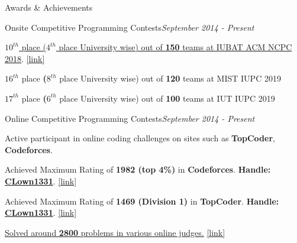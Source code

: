 \documentclass{resume}
\begin{document}
\begin{rSection}{Awards \& Achievements} 

\begin{rSubsection}{Onsite Competitive Programming Contests}{\em September 2014 - Present}{}{}{}
\item \href{https://icpc.baylor.edu/ICPCID/DII3NHEO8O8I}{\textbf{$10^{th}$} place (\textbf{$4^{th}$} place University wise) out of \textbf{150} teams at IUBAT ACM NCPC 2018}. \href{https://icpc.baylor.edu/ICPCID/DII3NHEO8O8I}{[link]}
\item \textbf{$16^{th}$} place \textbf(\textbf{$8^{th}$} place University wise) out of \textbf{120} teams at MIST IUPC 2019
\item \textbf{$17^{th}$} place \textbf(\textbf{$6^{th}$} place University wise) out of \textbf{100} teams at IUT IUPC 2019
\end{rSubsection}

\begin{rSubsection}{Online Competitive Programming Contests}{\em September 2014 - Present}{}{}{}
\item Active participant in online coding challenges on sites such as \textbf{TopCoder}, \textbf{Codeforces}.
\item Achieved Maximum Rating of \textbf{1982 (top 4\%)} in \textbf{Codeforces}. \textbf{Handle:} \textbf{\href{http://codeforces.com/profile/CLown1331}{CLown1331}}. \href{http://codeforces.com/profile/CLown1331}{[link]}
\item Achieved Maximum Rating of \textbf{1469 (Division 1)} in \textbf{TopCoder}. \textbf{Handle:} \textbf{\href{https://www.topcoder.com/members/CLown1331/}{CLown1331}}. \href{https://www.topcoder.com/members/CLown1331/}{[link]}
\item \href{https://www.stopstalk.com/user/profile/clown1331}{Solved around \textbf{2800} problems in various online judges.} \href{https://www.stopstalk.com/user/profile/clown1331}{[link]}
\end{rSubsection}

\end{rSection}
\end{document}
